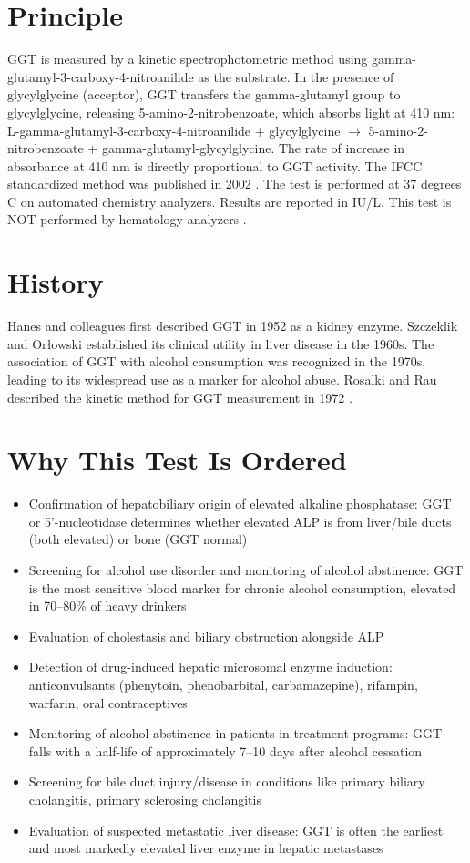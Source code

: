 \section*{Principle}
GGT is measured by a kinetic spectrophotometric method using gamma-glutamyl-3-carboxy-4-nitroanilide as the substrate. In the presence of glycylglycine (acceptor), GGT transfers the gamma-glutamyl group to glycylglycine, releasing 5-amino-2-nitrobenzoate, which absorbs light at 410 nm: L-gamma-glutamyl-3-carboxy-4-nitroanilide + glycylglycine $\rightarrow$ 5-amino-2-nitrobenzoate + gamma-glutamyl-glycylglycine. The rate of increase in absorbance at 410 nm is directly proportional to GGT activity. The IFCC standardized method was published in 2002 \cite{ifcc2002gamma}. The test is performed at 37 degrees C on automated chemistry analyzers. Results are reported in IU/L. This test is NOT performed by hematology analyzers \cite{tietz2023textbook}.

\section*{History}
Hanes and colleagues first described GGT in 1952 as a kidney enzyme. Szczeklik and Or{\l}owski established its clinical utility in liver disease in the 1960s. The association of GGT with alcohol consumption was recognized in the 1970s, leading to its widespread use as a marker for alcohol abuse. Rosalki and Rau described the kinetic method for GGT measurement in 1972 \cite{rosalki1972serum}.

\section*{Why This Test Is Ordered}
\begin{itemize}
  \item Confirmation of hepatobiliary origin of elevated alkaline phosphatase: GGT or 5'-nucleotidase determines whether elevated ALP is from liver/bile ducts (both elevated) or bone (GGT normal)
  \item Screening for alcohol use disorder and monitoring of alcohol abstinence: GGT is the most sensitive blood marker for chronic alcohol consumption, elevated in 70--80\% of heavy drinkers \cite{conigrave2003traditional}
  \item Evaluation of cholestasis and biliary obstruction alongside ALP
  \item Detection of drug-induced hepatic microsomal enzyme induction: anticonvulsants (phenytoin, phenobarbital, carbamazepine), rifampin, warfarin, oral contraceptives
  \item Monitoring of alcohol abstinence in patients in treatment programs: GGT falls with a half-life of approximately 7--10 days after alcohol cessation
  \item Screening for bile duct injury/disease in conditions like primary biliary cholangitis, primary sclerosing cholangitis
  \item Evaluation of suspected metastatic liver disease: GGT is often the earliest and most markedly elevated liver enzyme in hepatic metastases
\end{itemize}


